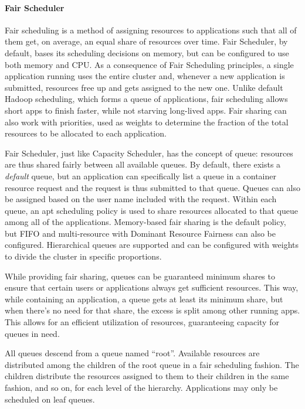 \paragraph{Fair Scheduler}

Fair scheduling is a method of assigning resources to applications such that all of them get, on average, an equal share of resources over time. Fair Scheduler, by default, bases its scheduling decisions on memory, but can be configured to use both memory and CPU. As a consequence of Fair Scheduling principles, a single application running uses the entire cluster and, whenever a new application is submitted, resources free up and gets assigned to the new one. Unlike default Hadoop scheduling, which forms a queue of applications, fair scheduling allows short apps to finish faster, while not starving long-lived apps. Fair sharing can also work with priorities, used as weights to determine the fraction of the total resources to be allocated to each application.

Fair Scheduler, just like Capacity Scheduler, has the concept of queue: resources are thus shared fairly between all available queues. By default, there exists a \textit{default} queue, but an application can specifically list a queue in a container resource request and the request is thus submitted to that queue. Queues can also be assigned based on the user name included with the request. Within each queue, an apt scheduling policy is used to share resources allocated to that queue among all of the applications. Memory-based fair sharing is the default policy, but FIFO and multi-resource with Dominant Resource Fairness \cite{Ghodsi:2011:DRF:1972457.1972490} can also be configured. Hierarchical queues are supported and can be configured with weights to divide the cluster in specific proportions. 

While providing fair sharing, queues can be guaranteed minimum shares to ensure that certain users or applications always get sufficient resources. This way, while containing an application, a queue gets at least its minimum share, but when there's no need for that share, the excess is split among other running apps. This allows for an efficient utilization of resources, guaranteeing capacity for queues in need.

All queues descend from a queue named “root”. Available resources are distributed among the children of the root queue in a fair scheduling fashion. The children distribute the resources assigned to them to their children in the same fashion, and so on, for each level of the hierarchy. Applications may only be scheduled on leaf queues.

